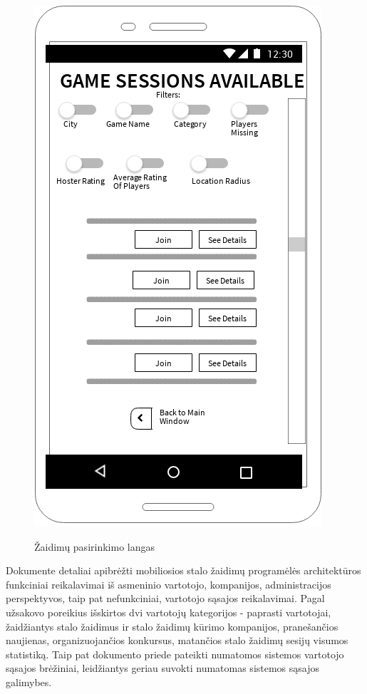 \documentclass{VUMIFPSkursinis}
\begin{document}
\begin{figure}[H]
	\centering
	\caption{Žaidimų pasirinkimo langas}
	\includegraphics[scale=0.9]{img/game_sessions_view}
	\label{img:game_sessions_view}
\end{figure}

Dokumente detaliai apibrėžti mobiliosios stalo žaidimų programėlės architektūros funkciniai reikalavimai iš asmeninio vartotojo, kompanijos, administracijos perspektyvos, taip pat nefunkciniai, vartotojo sąsajos reikalavimai. Pagal užsakovo poreikius išskirtos dvi vartotojų kategorijos - paprasti vartotojai, žaidžiantys stalo žaidimus ir stalo žaidimų kūrimo kompanijos, pranešančios naujienas, organizuojančios konkursus, matančios stalo žaidimų sesijų visumos statistiką. Taip pat dokumento priede pateikti numatomos sistemos vartotojo sąsajos brėžiniai, leidžiantys geriau suvokti numatomas sistemos sąsajos galimybes.
\end{document}
